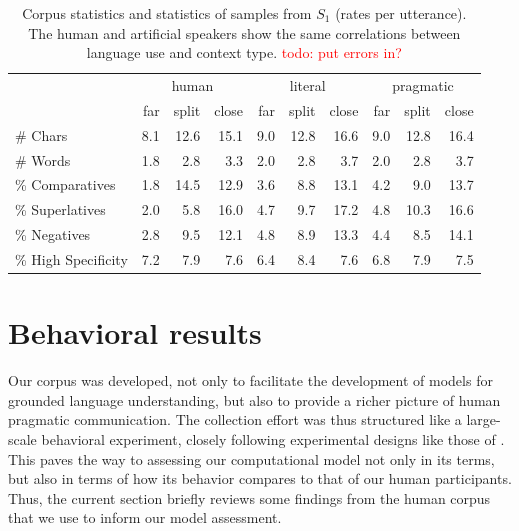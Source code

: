 \documentclass[11pt,letterpaper]{article}
\newcommand{\Speaker}{S}
\renewcommand{\|}{\mid}
\newcommand{\todocheck}[1]{\textcolor{red}{#1}}
\begin{document}
\begin{table}[ht]
\centering
\begin{tabular}{lrrr@{\hspace{40pt}}rrr@{\hspace{40pt}}rrr}
  \toprule
  & \multicolumn{3}{c}{human}& \multicolumn{3}{c}{literal}& \multicolumn{3}{c}{pragmatic}\\
  & far& split& close& far& split& close& far& split& close\\ \midrule
\# Chars & 8.1 & 12.6 & 15.1 & 9.0 & 12.8 & 16.6 & 9.0 & 12.8 & 16.4 \\ 
  \# Words & 1.8 & 2.8 & 3.3 & 2.0 & 2.8 & 3.7 & 2.0 & 2.8 & 3.7 \\ 
  \% Comparatives & 1.8 & 14.5 & 12.9 & 3.6 & 8.8 & 13.1 & 4.2 & 9.0 & 13.7 \\ 
  \% Superlatives & 2.0 & 5.8 & 16.0 & 4.7 & 9.7 & 17.2 & 4.8 & 10.3 & 16.6 \\   
  \% Negatives & 2.8 & 9.5 & 12.1 & 4.8 & 8.9 & 13.3 & 4.4 & 8.5 & 14.1 \\   
  \% High Specificity & 7.2 & 7.9 & 7.6 & 6.4 & 8.4 & 7.6 & 6.8 & 7.9 & 7.5 \\ 
   \bottomrule
\end{tabular}
\caption{Corpus statistics and statistics of samples from $\Speaker_1$
  (rates per utterance). The human and artificial speakers show
  the same correlations between language use and context type. \todocheck{todo: put errors in?}} 
\label{table:metrics}
\end{table}


\section{Behavioral results}

Our corpus was developed, not only to facilitate the development of
models for grounded language understanding, but also to provide a
richer picture of human pragmatic communication. The collection effort
was thus structured like a large-scale behavioral experiment, closely
following experimental designs like those of
. This paves the way to assessing our
computational model not only in its terms, but also in terms of how
its behavior compares to that of our human participants. Thus, the
current section briefly reviews some findings from the human
corpus that we use to inform our model assessment.
\end{document}
